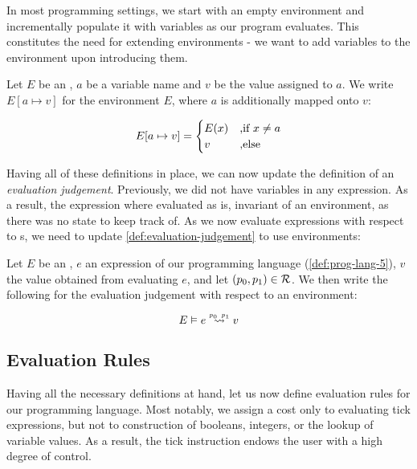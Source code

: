 In most programming settings, we start with an empty environment and incrementally populate it with variables as our program evaluates. This constitutes the need for extending environments - we want to add variables to the environment upon introducing them.

\begin{definition}\label{def:environment-augment}	
   Let \(E\) be an , \(a\) be a variable name and \(v\) be the value assigned to \(a\). We write \(E[a \mapsto v]\) for the environment \(E\), where \(a\) is additionally mapped onto \(v\):

   \[
      E[a \mapsto v] = 
      \begin{cases}
	 E(x)  & \mbox{,if } x \neq a\\
	 v     & \mbox{,else } 
      \end{cases}
   \]

\end{definition}

Having all of these definitions in place, we can now update the definition of an \emph{evaluation judgement}. Previously, we did not have variables in any expression. As a result, the expression where evaluated as is, invariant of an environment, as there was no state to keep track of. As we now evaluate expressions with respect to s, we need to update \cref{def:evaluation-judgement} to use environments:

\begin{definition}\label{def:eval-judgement-environments}
   Let \(E\) be an , \(e\) an expression of our programming language (\cref{def:prog-lang-5}), \(v\) the value obtained from evaluating \(e\), and let \((p_0, p_1) \in \mathcal{R}\). We then write the following for the evaluation judgement with respect to an environment:

   \[
      \evals{E}{e}{v}{p_0}{p_1}
   \]
	
\end{definition}

\subsection{Evaluation Rules}

Having all the necessary definitions at hand, let us now define evaluation rules for our programming language. Most notably, we assign a cost only to evaluating tick expressions, but not to construction of booleans, integers, or the lookup of variable values. As a result, the tick instruction endows the user with a high degree of control. 

